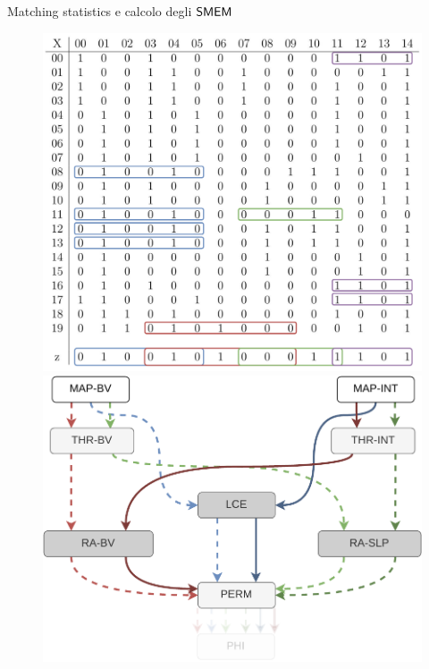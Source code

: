 \documentclass[]{beamer}
\def\SMEM{\mbox{\rm {\sf SMEM}}}
\begin{document}
\begin{frame}{Matching statistics e calcolo degli $\SMEM$}
  \vspace{-0.3cm}
 \begin{figure}[H]
    \centering
    \includegraphics[scale = 0.21, valign=t]{img/pbwtmatch.pdf}
    \includegraphics[scale = 0.3, valign=t]{img/mini_ms4.pdf}
  \end{figure}
  \vspace{-0.5cm}
  \begin{table}[H]
    \scriptsize
    \centering
    \begin{tabular}{c|ccccccccccccccc}

\end{tabular}
\end{table}
\end{frame}
\end{document}
